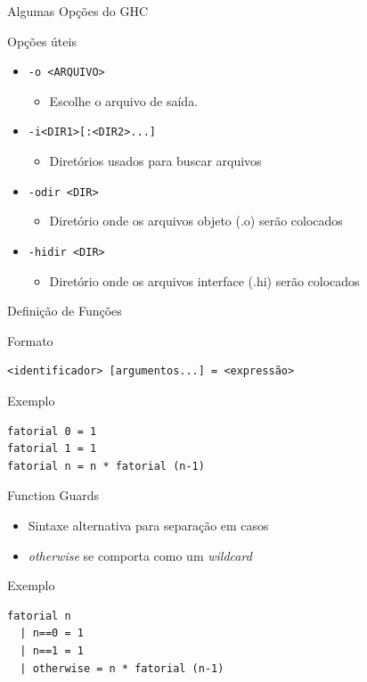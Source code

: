 \documentclass{beamer}
\begin{document}
		 
		 \begin{frame}[fragile]{Algumas Opções do GHC}
		 
		 \begin{block}{Opções úteis}
		  \begin{itemize}
		   \item \verb+-o <ARQUIVO>+
				\begin{itemize}
				 \item Escolhe o arquivo de saída.
				\end{itemize}
		   \item \verb+-i<DIR1>[:<DIR2>...]+		   
				\begin{itemize}
				 \item Diretórios usados para buscar arquivos
				\end{itemize}
		   \item \verb+-odir <DIR>+
				\begin{itemize}
				 \item Diretório onde os arquivos objeto (.o) serão colocados
				\end{itemize}
			\item \verb+-hidir <DIR>+
				\begin{itemize}
				 \item Diretório onde os arquivos interface (.hi) serão colocados
				\end{itemize}
		  \end{itemize}
		 \end{block}
		 
		\end{frame}		
		
		\begin{frame}[fragile]{Definição de Funções}
		 \begin{block}{Formato}
		  \begin{lstlisting}
<identificador> [argumentos...] = <expressão>
		  \end{lstlisting}
		 \end{block}
		 
		 \begin{block}{Exemplo}
		  \begin{lstlisting}
fatorial 0 = 1
fatorial 1 = 1
fatorial n = n * fatorial (n-1)
		  \end{lstlisting}
		 \end{block}
		\end{frame}
		
		\begin{frame}[fragile]{Function Guards}
		 \begin{itemize}
		  \item Sintaxe alternativa para separação em casos
		  \item \textit{otherwise} se comporta como um \textit{wildcard}
		 \end{itemize}
		 \begin{block}{Exemplo}
		 \begin{lstlisting}
fatorial n
  | n==0 = 1
  | n==1 = 1
  | otherwise = n * fatorial (n-1)
		\end{lstlisting}
		 \end{block}
		\end{frame}
\end{document}
